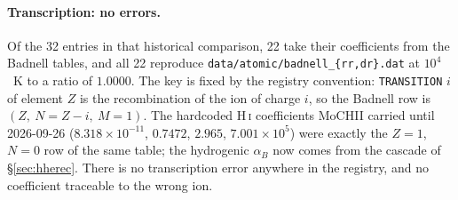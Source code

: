 \documentclass[english,a4paper]{my_memo}
\newcommand{\code}[1]{\texttt{#1}}
\begin{document}
\paragraph{Transcription: no errors.}  Of the 32 entries in that historical comparison, 22 take
their coefficients from the Badnell tables, and all 22 reproduce
\code{data/atomic/badnell\_\{rr,dr\}.dat} at $10^4$~K to a ratio of $1.0000$.
The key is fixed by the registry convention: \code{TRANSITION} $i$ of element
$Z$ is the recombination of the ion of charge $i$, so the Badnell row is
$(Z,\ N = Z - i,\ M = 1)$.  The hardcoded H\,\textsc{i} coefficients MoCHII
carried until 2026-09-26 ($8.318{\times}10^{-11}$, $0.7472$, $2.965$,
$7.001{\times}10^{5}$) were exactly the $Z = 1$, $N = 0$ row of the same
table; the hydrogenic $\alpha_B$ now comes from the cascade of
\S\ref{sec:hherec}.  There is no transcription error
anywhere in the registry, and no coefficient traceable to the wrong ion.
\end{document}
